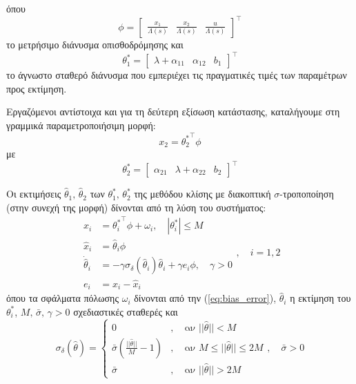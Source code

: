 \documentclass[a4paper,12pt]{article}
\begin{document}
όπου
\begin{equation}
    \phi = 
    \begin{bmatrix}
        \frac{x_1}{\Lambda(s)} & \frac{x_2}{\Lambda(s)} & \frac{u}{\Lambda(s)}
    \end{bmatrix}^{\top}
    \label{eq:regresson_vector}
\end{equation}
το μετρήσιμο διάνυσμα οπισθοδρόμησης και
\begin{equation}
    \theta_1^* = 
    \begin{bmatrix}
        \lambda + \alpha_{11} & \alpha_{12} & b_1
    \end{bmatrix}^{\top}
    \label{eq:theta_star_1}
\end{equation}
το άγνωστο σταθερό διάνυσμα που εμπεριέχει τις πραγματικές τιμές των παραμέτρων προς εκτίμηση.

Εργαζόμενοι αντίστοιχα και για τη δεύτερη εξίσωση κατάστασης, καταλήγουμε στη γραμμικά 
παραμετροποιήσιμη μορφή:
\[
    x_2 = {\theta_2^*}^{\top} \phi
\]
με
\begin{equation}
    \theta_2^* = 
    \begin{bmatrix}
        \alpha_{21} & \lambda + \alpha_{22} & b_2
    \end{bmatrix}^{\top}
    \label{eq:theta_star_2}
\end{equation}

Οι εκτιμήσεις $\hat{\theta}_1, \, \hat{\theta}_2$ των $\theta_1^*, \, \theta_2^*$ της μεθόδου κλίσης με
διακοπτική $\sigma$-τροποποίηση (στην συνεχή της μορφή) δίνονται από τη λύση του συστήματος:
\begin{equation}
    \begin{aligned}
    x_i &= {\theta_i^*}^{\top} \phi + \omega_i, \quad |\theta_i^*| \leq M \\
    \hat{x}_i &= \hat{\theta}_i \phi \\
    \dot{\hat{\theta}}_i &= - \gamma \sigma_{\delta}(\hat{\theta}_i) \hat{\theta}_i + 
    \gamma e_i \phi, \quad \gamma > 0 \\
    e_i &= x_i - \hat{x}_i
    \end{aligned}, \quad i = 1, 2
    \label{eq:gradient_switching_sigma_modification}
\end{equation}
όπου τα σφάλματα πόλωσης $\omega_i$ δίνονται από την (\ref{eq:bias_error}), $\hat{\theta}_i$ η εκτίμηση
του $\theta_i^*$, $M, \, \bar{\sigma}, \, \gamma > 0$ σχεδιαστικές σταθερές και
\begin{equation*}
    \sigma_{\delta}(\hat{\theta}) = 
    \left\{
    \begin{aligned}
        0&, \quad \texttt{αν } ||\hat{\theta}|| < M \\
        \bar{\sigma}\left(\frac{||\hat{\theta}||}{M} - 1\right)&, 
        \quad \texttt{αν } M \leq ||\hat{\theta}|| \leq 2M \\
        \bar{\sigma}&, \quad \texttt{αν } ||\hat{\theta}|| > 2M
    \end{aligned}, \quad \bar{\sigma} > 0
    \right.
\end{equation*}
\end{document}
